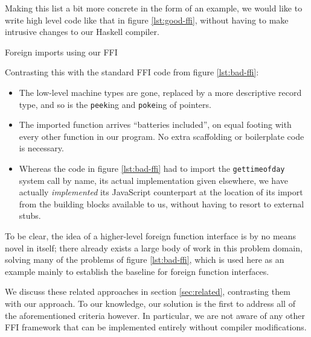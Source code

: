 \documentclass[preprint]{sigplanconf}
\begin{document}
Making this list a bit more concrete in the form of an example, we would like
to write high level code like that in figure \ref{lst:good-ffi}, without
having to make intrusive changes to our Haskell compiler.

\begin{listingfloat}
\caption{Foreign imports using our FFI}
\label{lst:good-ffi}
\end{listingfloat}

Contrasting this with the standard FFI code from figure \ref{lst:bad-ffi}:

\begin{itemize}
\item
  The low-level machine types are gone, replaced by a more descriptive record
  type, and so is the \lstinline!peek!ing and \lstinline!poke!ing of pointers.
\item
  The imported function arrives ``batteries included'', on equal footing with
  every other function in our program. No extra scaffolding or boilerplate
  code is necessary.
\item
  Whereas the code in figure \ref{lst:bad-ffi} had to import the
  \lstinline!gettimeofday! system call by name, its actual implementation
  given elsewhere, we have actually \emph{implemented} its JavaScript
  counterpart at the location of its import from the building blocks
  available to us, without having to resort to external stubs.
\end{itemize}

To be clear, the idea of a higher-level foreign function interface is by no
means novel in itself;
there already exists a large body of work in this problem domain, solving many
of the problems of figure \ref{lst:bad-ffi},
which is used here as an example mainly to
establish the baseline for foreign function interfaces.

We discuss these related approaches in section \ref{sec:related}, contrasting
them with our approach. To our knowledge, our solution is the first to address
all of the aforementioned criteria however.
In particular, we are not aware of any other FFI framework that can be
implemented entirely without compiler modifications.
\end{document}
